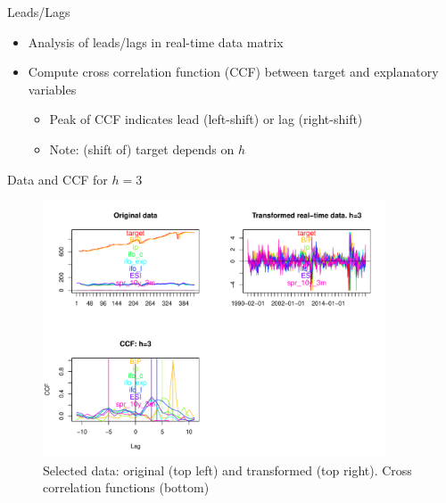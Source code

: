 \documentclass{beamer}
\begin{document}
\begin{frame} {Leads/Lags}
\begin{itemize}
\item Analysis of leads/lags in real-time data matrix
\item Compute cross correlation function (CCF) between target and explanatory variables
\begin{itemize}
\item Peak of CCF indicates lead (left-shift) or lag (right-shift)
\item Note: (shift of) target depends on $h$
\end{itemize}
\end{itemize}
\end{frame}



\begin{frame} {Data and CCF for $h=3$}
\begin{figure}[H]\begin{center}\includegraphics[height=3in, width=4in]{data.pdf}\caption{Selected data: original (top left) and transformed (top right). Cross correlation functions (bottom) \label{cor}}\end{center}\end{figure}\end{frame}
\end{document}
